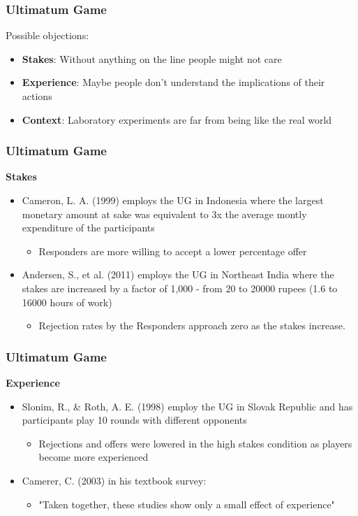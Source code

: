 \documentclass{beamer}
\begin{document}
\begin{frame}
	\frametitle{Ultimatum Game}
	Possible objections:
	\begin{itemize}
		\item \textbf{Stakes}: Without anything on the line people might not care
		\item \textbf{Experience}: Maybe people don't understand the implications of their actions
		\item \textbf{Context}: Laboratory experiments are far from being like the real world
	\end{itemize}
\end{frame}

\begin{frame}
	\frametitle{Ultimatum Game}
	\textbf{Stakes}
	
	\begin{itemize}
		\item Cameron, L. A. (1999) employs the UG in Indonesia where the largest monetary amount at sake was equivalent to 3x the average montly expenditure of the participants
		\begin{itemize}
			\item Responders are more willing to accept a lower percentage offer
		\end{itemize}
		\item Andersen, S., et al. (2011) employs the UG in Northeast India where the stakes are increased by a factor of 1,000 - from 20 to 20000 rupees (1.6 to 16000 hours of work)
		\begin{itemize}
			\item Rejection rates by the Responders approach zero as the stakes increase.
		\end{itemize}
	\end{itemize}
	
	
	
\end{frame}

\begin{frame}
	\frametitle{Ultimatum Game}
	\textbf{Experience}
	
	\begin{itemize}
		\item Slonim, R., \& Roth, A. E. (1998) employ the UG in Slovak Republic and has participants play 10 rounds with different opponents
		\begin{itemize}
			\item Rejections and offers were lowered in the high stakes condition as players become more experienced
		\end{itemize}
		\item Camerer, C. (2003) in his textbook survey: 
		\begin{itemize}
			\item "Taken together, these studies show only a small effect of experience"
		\end{itemize}
	\end{itemize}	
	
\end{frame}
\end{document}
